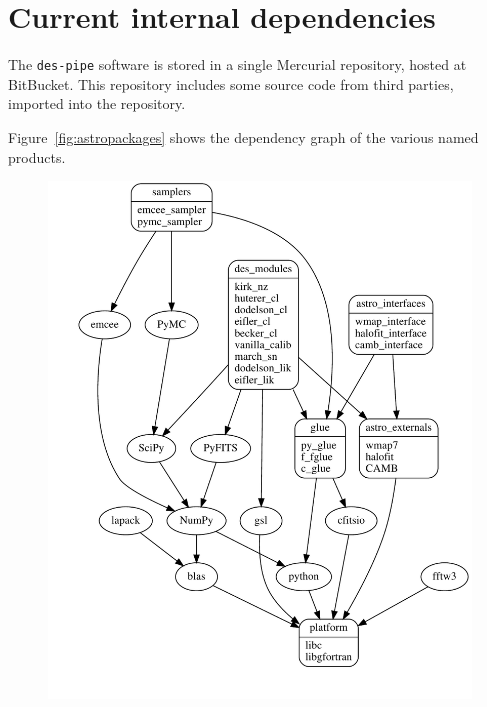 \documentclass[draftmode,draftwater]{memarticle}
\begin{document}
\section{Current internal dependencies}

The \texttt{des-pipe} software is stored in a single
Mercurial\cite{mercurial} repository, hosted at
BitBucket\cite{bitbucket}. This repository includes some source code
from third parties, imported into the repository.

Figure~\ref{fig:astropackages} shows the dependency graph of the various
named products.

\begin{figure}
  \centering
{%
  \includegraphics[width=0.95\textheight]{astro_packages}
}{%
}
\end{figure}
\end{document}
